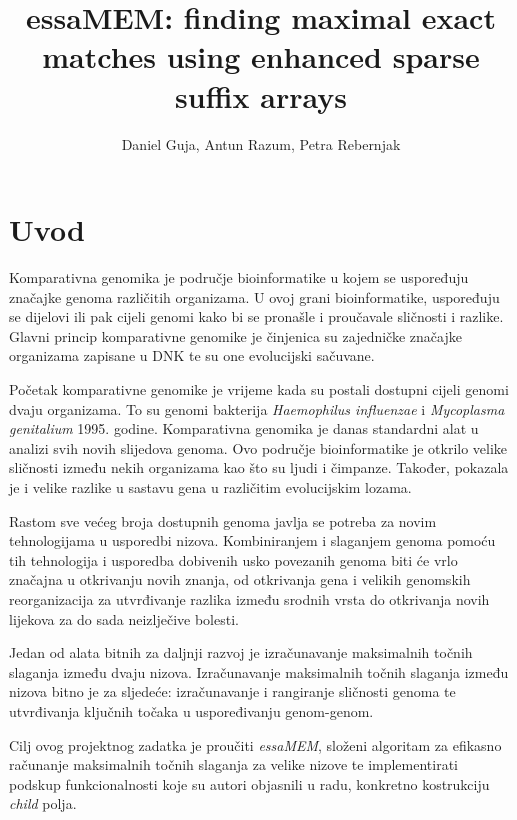 \documentclass[times, utf8, seminar, numeric]{fer}
\begin{document}
\title{essaMEM: finding maximal exact matches using enhanced sparse suffix arrays}
\author{Daniel Guja, Antun Razum, Petra Rebernjak}

\maketitle
\tableofcontents

\chapter{Uvod}

Komparativna genomika je područje bioinformatike u kojem se uspoređuju značajke genoma različitih organizama. U ovoj grani bioinformatike, uspoređuju se dijelovi ili pak cijeli genomi kako bi se pronašle i proučavale sličnosti i razlike. Glavni princip komparativne genomike je činjenica su zajedničke značajke organizama zapisane u DNK te su one evolucijski sačuvane.

Početak komparativne genomike je vrijeme kada su postali dostupni cijeli genomi dvaju organizama. To su genomi bakterija \textit{Haemophilus influenzae} i \textit{Mycoplasma genitalium} 1995. godine. Komparativna genomika je danas standardni alat u analizi svih novih slijedova genoma. Ovo područje bioinformatike je otkrilo velike sličnosti između nekih organizama kao što su ljudi i čimpanze. Također, pokazala je i velike razlike u sastavu gena u različitim evolucijskim lozama.

Rastom sve većeg broja dostupnih genoma javlja se potreba za novim tehnologijama u usporedbi nizova. Kombiniranjem i slaganjem genoma pomoću tih tehnologija i usporedba dobivenih usko povezanih genoma biti će vrlo značajna u otkrivanju novih znanja, od otkrivanja gena i velikih genomskih reorganizacija za utvrđivanje razlika između srodnih vrsta do otkrivanja novih lijekova za do sada neizlječive bolesti.

Jedan od alata bitnih za daljnji razvoj je izračunavanje maksimalnih točnih slaganja između dvaju nizova. Izračunavanje maksimalnih točnih slaganja između nizova bitno je za sljedeće: izračunavanje i rangiranje sličnosti genoma te utvrđivanja ključnih točaka u uspoređivanju genom-genom.

Cilj ovog projektnog zadatka je proučiti \textit{essaMEM}\cite{essa}, složeni algoritam za efikasno računanje maksimalnih točnih slaganja za velike nizove te implementirati podskup funkcionalnosti koje su autori objasnili u radu, konkretno kostrukciju \textit{child} polja.
\end{document}
